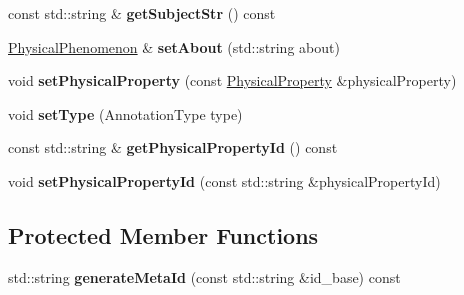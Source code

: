\begin{DoxyCompactItemize}
const std\+::string \& {\bfseries get\+Subject\+Str} () const
\item 
\mbox{\label{classomexmeta_1_1PhysicalPhenomenon_a0a9c54b0c4bfad62b618766474dc70f8}} 
\hyperlink{classomexmeta_1_1PhysicalPhenomenon}{Physical\+Phenomenon} \& {\bfseries set\+About} (std\+::string about)
\item 
\mbox{\label{classomexmeta_1_1PhysicalPhenomenon_afad41dbf096b22ab9b64441cb25e9db9}} 
void {\bfseries set\+Physical\+Property} (const \hyperlink{classomexmeta_1_1PhysicalProperty}{Physical\+Property} \&physical\+Property)
\item 
\mbox{\label{classomexmeta_1_1PhysicalPhenomenon_a4c27a0b0e430df95b3cffaf268973eec}} 
void {\bfseries set\+Type} (Annotation\+Type type)
\item 
\mbox{\label{classomexmeta_1_1PhysicalPhenomenon_a8d89c1a5b1d4cdf16ab9f423562322db}} 
const std\+::string \& {\bfseries get\+Physical\+Property\+Id} () const
\item 
\mbox{\label{classomexmeta_1_1PhysicalPhenomenon_a715b76003eba8e5808fe44a768199fab}} 
void {\bfseries set\+Physical\+Property\+Id} (const std\+::string \&physical\+Property\+Id)
\end{DoxyCompactItemize}
\subsection*{Protected Member Functions}
\begin{DoxyCompactItemize}
\item 
\mbox{\label{classomexmeta_1_1PhysicalPhenomenon_aa77b6063825e8bc3b83516e923c5ad37}} 
std\+::string {\bfseries generate\+Meta\+Id} (const std\+::string \&id\+\_\+base) const
\end{DoxyCompactItemize}
